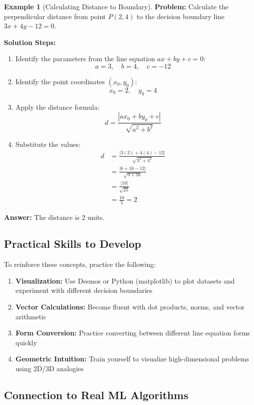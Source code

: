\documentclass[12pt,a4paper]{article}
\theoremstyle{directpoint}
\theoremstyle{definition}
\newtheorem{example}{Example}[section]
\begin{document}
\begin{example}[Calculating Distance to Boundary]
\textbf{Problem:} Calculate the perpendicular distance from point $P(2, 4)$ to the decision boundary line $3x + 4y - 12 = 0$.

\textbf{Solution Steps:}
\begin{enumerate}
    \item Identify the parameters from the line equation $ax + by + c = 0$:
    $$ a = 3, \quad b = 4, \quad c = -12 $$
    \item Identify the point coordinates $(x_0, y_0)$:
    $$ x_0 = 2, \quad y_0 = 4 $$
    \item Apply the distance formula:
    $$ d = \frac{|ax_0 + by_0 + c|}{\sqrt{a^2 + b^2}} $$
    \item Substitute the values:
    \begin{align*}
    d &= \frac{|3(2) + 4(4) - 12|}{\sqrt{3^2 + 4^2}} \\
    &= \frac{|6 + 16 - 12|}{\sqrt{9 + 16}} \\
    &= \frac{|10|}{\sqrt{25}} \\
    &= \frac{10}{5} = 2
    \end{align*}
\end{enumerate}
\textbf{Answer:} The distance is 2 units.
\end{example}

\subsection{Practical Skills to Develop}

To reinforce these concepts, practice the following:

\begin{enumerate}
    \item \textbf{Visualization:} Use Desmos or Python (matplotlib) to plot datasets and experiment with different decision boundaries
    \item \textbf{Vector Calculations:} Become fluent with dot products, norms, and vector arithmetic
    \item \textbf{Form Conversion:} Practice converting between different line equation forms quickly
    \item \textbf{Geometric Intuition:} Train yourself to visualize high-dimensional problems using 2D/3D analogies
\end{enumerate}

\subsection{Connection to Real ML Algorithms}
\end{document}
